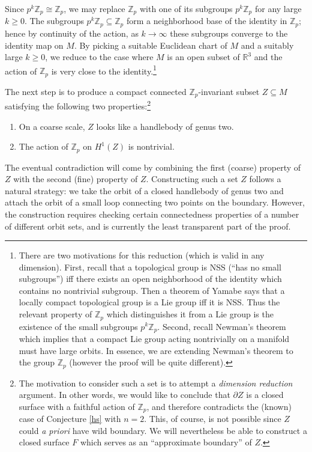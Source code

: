 \documentclass[12pt]{article}
\theoremstyle{plain}
\theoremstyle{definition}
\theoremstyle{remark}
\numberwithin{equation}{section}
\begin{document}
Since $p^k\mathbb Z_p\cong\mathbb Z_p$, we may replace $\mathbb Z_p$ with one of its subgroups $p^k\mathbb Z_p$ for any large $k\geq 0$.  The subgroups $p^k\mathbb Z_p\subseteq\mathbb Z_p$ form a neighborhood base of the identity in $\mathbb Z_p$; hence by continuity of the action, as $k\to\infty$ these subgroups converge to the identity map on $M$.  By picking a suitable Euclidean chart of $M$ and a suitably large $k\geq 0$, we reduce to the case where $M$ is an open subset of $\mathbb R^3$ and the action of $\mathbb Z_p$ is very close to the identity.\footnote{There are two motivations for this reduction (which is valid in any dimension).  First, recall that a topological group is NSS (``has no small subgroups'') iff there exists an open neighborhood of the identity which contains no nontrivial subgroup.  Then a theorem of Yamabe \cite[p364 Theorem 3]{yamabe2} says that a locally compact topological group is a Lie group iff it is NSS.  Thus the relevant property of $\mathbb Z_p$ which distinguishes it from a Lie group is the existence of the small subgroups $p^k\mathbb Z_p$.  Second, recall Newman's theorem \cite{newman} which implies that a compact Lie group acting nontrivially on a manifold must have large orbits.  In essence, we are extending Newman's theorem to the group $\mathbb Z_p$ (however the proof will be quite different).}

The next step is to produce a compact connected $\mathbb Z_p$-invariant subset $Z\subseteq M$ satisfying the following two properties:\footnote{The motivation to consider such a set is to attempt a \emph{dimension reduction} argument.  In other words, we would like to conclude that $\partial Z$ is a closed surface with a faithful action of $\mathbb Z_p$, and therefore contradicts the (known) case of Conjecture \ref{hs} with $n=2$.  This, of course, is not possible since $Z$ could \emph{a priori} have wild boundary.  We will nevertheless be able to construct a closed surface $F$ which serves as an ``approximate boundary'' of $Z$.}
\begin{enumerate}
\item On a coarse scale, $Z$ looks like a handlebody of genus two.
\item The action of $\mathbb Z_p$ on $H^1(Z)$ is nontrivial.
\end{enumerate}
The eventual contradiction will come by combining the first (coarse) property of $Z$ with the second (fine) property of $Z$.  Constructing such a set $Z$ follows a natural strategy: we take the orbit of a closed handlebody of genus two and attach the orbit of a small loop connecting two points on the boundary.  However, the construction requires checking certain connectedness properties of a number of different orbit sets, and is currently the least transparent part of the proof.
\end{document}

